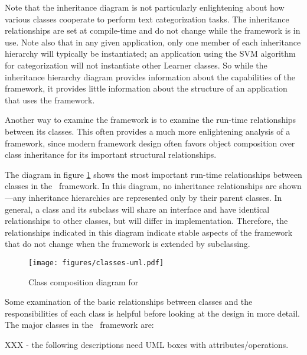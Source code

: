 Note that the inheritance diagram is not particularly enlightening
about how various classes cooperate to perform text categorization
tasks.  The inheritance relationships are set at compile-time and do
not change while the framework is in use.  Note also that in any given
application, only one member of each inheritance hierarchy will
typically be instantiated; an application using the SVM algorithm for
categorization will not instantiate other Learner classes.  So while
the inheritance hierarchy diagram provides information about the
capabilities of the framework, it provides little information about
the structure of an application that uses the framework.

Another way to examine the framework is to examine the run-time
relationships between its classes.  This often provides a much more
enlightening analysis of a framework, since modern framework design
often favors object composition over class inheritance for its
important structural relationships. \cite[p. 20]{gamma:95}

The diagram in figure \ref{classes-uml} shows the
most important run-time relationships between classes in the
\aicat\ framework.  In this diagram, no inheritance
relationships are shown---any inheritance hierarchies are represented
only by their parent classes.  In general, a class and its subclass
will share an interface and have identical relationships to other
classes, but will differ in implementation.  Therefore, the
relationships indicated in this diagram indicate stable aspects of the
framework that do not change when the framework is extended by
subclassing.

\begin{figure}
\texttt{[image: figures/classes-uml.pdf]}
\caption{Class composition diagram for \aicat}
\label{classes-uml}
\end{figure}

Some examination of the basic relationships between classes and the
responsibilities of each class is helpful before looking at the design
in more detail.  The major classes in the \aicat\ framework
are:

XXX - the following descriptions need UML boxes with attributes/operations.

